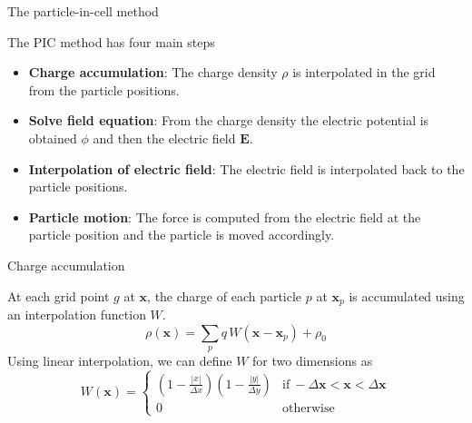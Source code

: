\documentclass{beamer}
\newcommand*\V[1]{\bm{#1}}
\newcommand{\E}{\V{E}}
\newcommand{\x}{\V{x}}
\begin{document}
\begin{frame}{The particle-in-cell method}{}

The PIC method has four main steps

\begin{itemize}
\setlength\itemsep{1em}
\item \textbf{Charge accumulation}: The charge density $\rho$ is interpolated in 
the grid from the particle positions.
\pause
\item \textbf{Solve field equation}: From the charge density the electric 
potential is obtained $\phi$ and then the electric field $\E$.
\pause
\item \textbf{Interpolation of electric field}: The electric field is  
interpolated back to the particle positions.
\pause
\item \textbf{Particle motion}: The force is computed from the electric field at 
the particle position and the particle is moved accordingly.
\end{itemize}
\end{frame}

\begin{frame}{Charge accumulation}{}

At each grid point $g$ at $\x$, the charge of each particle $p$ at $\x_p$ is 
accumulated using an interpolation function $W$.
\begin{equation}%
\rho(\x) = \sum_p q\,W(\x - \x_p) + \rho_0
\label{eq:charge-accumulation}
\end{equation}%
Using linear interpolation, we can define $W$ for two dimensions as
\begin{equation}%
W(\x) =
\begin{cases}
			\displaystyle\left(1 - \frac{|x|}{\Delta x}\right)
				\left(1 - \frac{|y|}{\Delta y}\right) & \text{if}\ -\Delta\x < \x < 
				\Delta \x\\
			0 & \text{otherwise}
\end{cases}
\end{equation}%
\end{frame}
\end{document}

